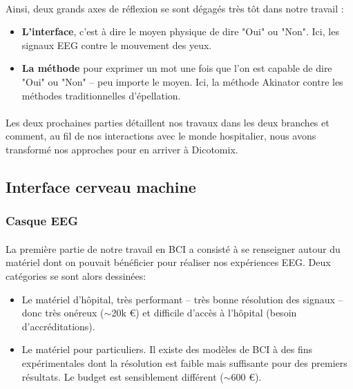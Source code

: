 \documentclass[11pt,a4paper]{article}
\theoremstyle{plain}
\theoremstyle{definition}
\begin{document}
\paragraph{} Ainsi, deux grands axes de réflexion se sont dégagés très tôt dans notre travail :
\begin{itemize}
\item \textbf{L'interface}, c'est à dire le moyen physique de dire "Oui" ou "Non". Ici, les signaux EEG contre le mouvement des yeux.
\item \textbf{La méthode} pour exprimer un mot une fois que l'on est capable de dire "Oui" ou "Non" -- peu importe le moyen. Ici, la méthode Akinator contre les méthodes traditionnelles d'épellation.
\end{itemize}

\paragraph{} Les deux prochaines parties détaillent nos travaux dans les deux branches et comment, au fil de nos interactions avec le monde hospitalier, nous avons transformé nos approches pour en arriver à Dicotomix.

\subsection{Interface cerveau machine}
\subsubsection{Casque EEG}
\paragraph{} La première partie de notre travail en BCI a consisté à se renseigner autour du matériel dont on pouvait bénéficier pour réaliser nos expériences EEG. Deux catégories se sont alors dessinées:
\begin{itemize}
    \item Le matériel d'hôpital, très performant -- très bonne résolution des signaux -- donc très onéreux ($\sim$20k \euro{}) et difficile d'accès à l'hôpital (besoin d'accréditations).
    \item Le matériel pour particuliers. Il existe des modèles de BCI à des fins expérimentales dont la résolution
    est faible mais suffisante pour des premiers résultats. Le budget est sensiblement différent ($\sim$600 \euro{}).
\end{itemize}
\end{document}
